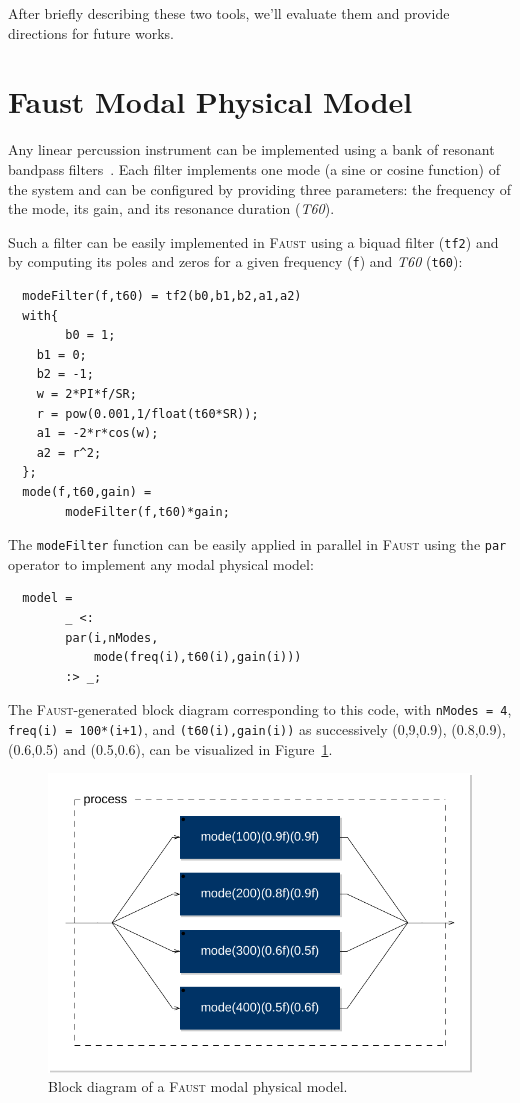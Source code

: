 \documentclass[11pt,a4paper]{article}
\newcommand{\f}{\textsc{Faust}}
\begin{document}
After briefly describing these two tools, we'll evaluate them and provide directions for future works.

\section{Faust Modal Physical Model}
\label{sec:model}

Any linear percussion instrument can be implemented using a bank of resonant bandpass filters~\cite{Smith2010}. Each filter implements one mode (a sine or cosine function) of the system and can be configured by providing three parameters: the frequency of the mode, its gain, and its resonance duration (\textit{T60}).

Such a filter can be easily implemented in \f{} using a biquad filter (\texttt{tf2}) and by computing its poles and zeros for a given frequency (\texttt{f}) and \textit{T60} (\texttt{t60}):

\begin{lstlisting}
  modeFilter(f,t60) = tf2(b0,b1,b2,a1,a2)
  with{
        b0 = 1;
	b1 = 0;
	b2 = -1;
	w = 2*PI*f/SR;
	r = pow(0.001,1/float(t60*SR));
	a1 = -2*r*cos(w);
	a2 = r^2;
  };
  mode(f,t60,gain) =
        modeFilter(f,t60)*gain;
\end{lstlisting}

The \texttt{modeFilter} function can be easily applied in parallel in \f{} using the \texttt{par} operator to implement any modal physical model:

\begin{lstlisting}
  model =
        _ <:
        par(i,nModes,
            mode(freq(i),t60(i),gain(i)))
        :> _;
\end{lstlisting}

The \f{}-generated block diagram corresponding to this code, with \lstinline{nModes = 4}, \lstinline{freq(i) = 100*(i+1)}, and \lstinline{(t60(i),gain(i))} as successively (0,9,0.9), (0.8,0.9), (0.6,0.5) and (0.5,0.6), can be visualized in Figure~\ref{fig:modalModel}.

\begin{figure}[htbp]
 	\centering \includegraphics[width=\columnwidth]{pictures/modalModel}
	\caption{Block diagram of a \f{} modal physical model.}
	\label{fig:modalModel}
\end{figure}
\end{document}
